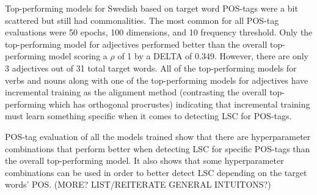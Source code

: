 Top-performing models for Swedish based on target word POS-tags were a bit scattered but still had commonalities. The most common for all POS-tag evaluations were 50 epochs, 100 dimensions, and 10 frequency threshold. Only the top-performing model for adjectives performed better than the overall top-performing model scoring a $\rho$ of 1 by a DELTA of 0.349. However, there are only 3 adjectives out of 31 total target words. All of the top-performing models for verbs and nouns along with one of the top-performing models for adjectives have incremental training as the alignment method (contrasting the overall top-performing which has orthogonal procrustes) indicating that incremental training must learn something specific when it comes to detecting LSC for POS-tags. 

POS-tag evaluation of all the models trained show that there are hyperparameter combinations that perform better when detecting LSC for specific POS-tags than the overall top-performing model. It also shows that some hyperparameter combinations can be used in order to better detect LSC depending on the target words’ POS. (MORE? LIST/REITERATE GENERAL INTUITONS?)
